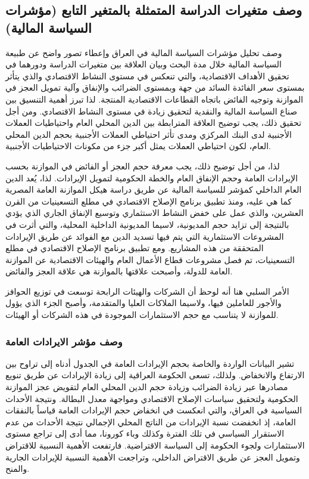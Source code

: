 \documentclass[10pt,a4paper]{report}
\begin{document}
\begin{doublespacing}
\subsection{وصف متغيرات الدراسة المتمثلة بالمتغير التابع (مؤشرات السياسة المالية)}
وصف تحليل مؤشرات السياسة المالية في العراق وإعطاء تصور واضح عن طبيعة السياسة المالية خلال مدة البحث وبيان العلاقة بين متغيرات الدراسة ودورهما في تحقيق الأهداف الاقتصادية، والتي تنعكس في مستوى النشاط الاقتصادي والذي يتأثر بمستوى سعر الفائدة السائد من جهة وبمستوى الضرائب والإنفاق وآلية تمويل العجز في الموازنة وتوجيه الفائض باتجاه القطاعات الاقتصادية المنتجة. لذا تبرز أهمية التنسيق بين صناع السياسة المالية والنقدية لتحقيق زيادة في مستوى النشاط الاقتصادي. ومن أجل تحقيق ذلك، يجب توضيح العلاقة المترابطة بين الدين المحلي العام واحتياطيات العملات الأجنبية لدى البنك المركزي ومدى تأثر احتياطي العملات الأجنبية بحجم الدين المحلي العام، لكون احتياطي العملات يمثل أكبر جزء من مكونات الاحتياطيات الأجنبية. 

لذا، من أجل توضيح ذلك، يجب معرفة حجم العجز أو الفائض في الموازنة بحسب الإيرادات العامة وحجم الإنفاق العام والخطة الحكومية لتمويل الإيرادات. لذا، يُعد الدين العام الداخلي كمؤشر للسياسة المالية عن طريق دراسة هيكل الموازنة العامة المصرية كما هي عليه، ومنذ تطبيق برنامج الإصلاح الاقتصادي في مطلع التسعينيات من القرن العشرين، والذي عمل على خفض النشاط الاستثماري وتوسيع الإنفاق الجاري الذي يؤدي بالنتيجة إلى تزايد حجم المديونية، لاسيما المديونية الداخلية المحلية، والتي أثرت في المشروعات الاستثمارية التي يتم فيها تسديد الدين مع الفوائد عن طريق الإيرادات المتحققة من هذه المشاريع. ومع تطبيق برنامج الإصلاح الاقتصادي في مطلع التسعينيات، تم فصل مشروعات قطاع الأعمال العام والهيئات الاقتصادية عن الموازنة العامة للدولة، وأصبحت علاقتها بالموازنة هي علاقة العجز والفائض. 

الأمر السلبي هنا أنه لوحظ أن الشركات والهيئات الرابحة توسعت في توزيع الحوافز والأجور للعاملين فيها، ولاسيما الملاكات العليا والمتقدمة، وأصبح الجزء الذي يؤول للموازنة لا يتناسب مع حجم الاستثمارات الموجودة في هذه الشركات أو الهيئات.
\subsubsection{وصف مؤشر الايرادات العامة}
تشير البيانات الواردة والخاصة بحجم الإيرادات العامة في الجدول أدناه إلى تراوح بين الارتفاع والانخفاض. ولذلك، تسعى الحكومة العراقية إلى زيادة الإيرادات عن طريق تنويع مصادرها عبر زيادة الضرائب وزيادة حجم الدين المحلي العام لتقويض عجز الموازنة الحكومية ولتحقيق سياسات الإصلاح الاقتصادي ومواجهة معدل البطالة. ونتيجة الأحداث السياسية في العراق، والتي انعكست في انخفاض حجم الإيرادات العامة قياساً بالنفقات العامة، إذ انخفضت نسبة الإيرادات من الناتج المحلي الإجمالي نتيجة الأحداث من عدم الاستقرار السياسي في تلك الفترة وكذلك وباء كورونا، مما أدى إلى تراجع مستوى الاستثمارات ولجوء الحكومة إلى السياسة الاقتراضية. فارتفعت الأهمية النسبية للاقتراض وتمويل العجز عن طريق الاقتراض الداخلي، وتراجعت الأهمية النسبية للإيرادات الجارية والمنح. 


\end{doublespacing}
\end{document}
